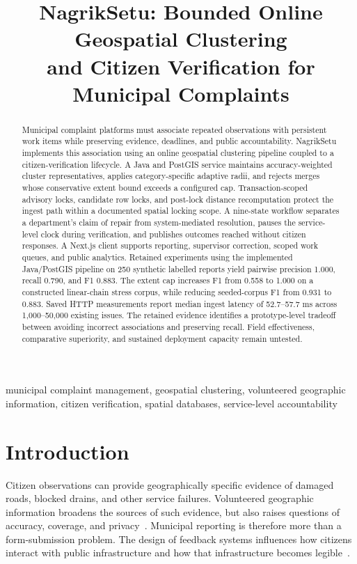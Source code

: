 \documentclass[conference,a4paper]{IEEEtran}
\title{NagrikSetu: Bounded Online Geospatial Clustering\\
and Citizen Verification for Municipal Complaints}
\author{
\IEEEauthorblockN{Maurya Raheja (1024030078), Udhey Goyal (1024030084), and Vansh Nanda (1024030091)}
\IEEEauthorblockA{Thapar Institute of Engineering and Technology\\Patiala, India}
}
\begin{document}
\maketitle

\begin{abstract}
Municipal complaint platforms must associate repeated observations with persistent work items while preserving evidence, deadlines, and public accountability. NagrikSetu implements this association using an online geospatial clustering pipeline coupled to a citizen-verification lifecycle. A Java and PostGIS service maintains accuracy-weighted cluster representatives, applies category-specific adaptive radii, and rejects merges whose conservative extent bound exceeds a configured cap. Transaction-scoped advisory locks, candidate row locks, and post-lock distance recomputation protect the ingest path within a documented spatial locking scope. A nine-state workflow separates a department's claim of repair from system-mediated resolution, pauses the service-level clock during verification, and publishes outcomes reached without citizen responses. A Next.js client supports reporting, supervisor correction, scoped work queues, and public analytics. Retained experiments using the implemented Java/PostGIS pipeline on 250 synthetic labelled reports yield pairwise precision 1.000, recall 0.790, and F1 0.883. The extent cap increases F1 from 0.558 to 1.000 on a constructed linear-chain stress corpus, while reducing seeded-corpus F1 from 0.931 to 0.883. Saved HTTP measurements report median ingest latency of 52.7--57.7 ms across 1,000--50,000 existing issues. The retained evidence identifies a prototype-level tradeoff between avoiding incorrect associations and preserving recall. Field effectiveness, comparative superiority, and sustained deployment capacity remain untested.
\end{abstract}

\begin{IEEEkeywords}
municipal complaint management, geospatial clustering, volunteered geographic information, citizen verification, spatial databases, service-level accountability
\end{IEEEkeywords}

\section{Introduction}
Citizen observations can provide geographically specific evidence of damaged roads, blocked drains, and other service failures. Volunteered geographic information broadens the sources of such evidence, but also raises questions of accuracy, coverage, and privacy~\cite{goodchild2007}. Municipal reporting is therefore more than a form-submission problem. The design of feedback systems influences how citizens interact with public infrastructure and how that infrastructure becomes legible~\cite{offenhuber2015}.
\end{document}
